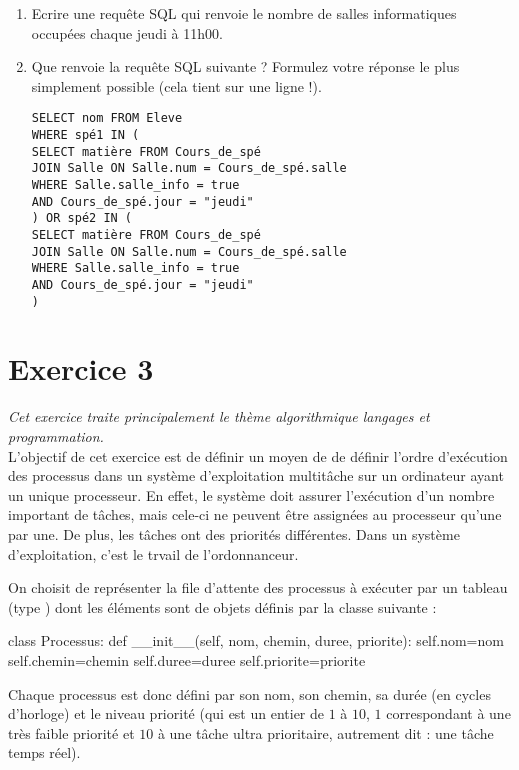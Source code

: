 \documentclass[11pt,a4paper,french,twoside]{PMCours}
\begin{document}
\begin{enumerate}
\item Ecrire une requête SQL qui renvoie le nombre de salles informatiques occupées chaque jeudi à 11h00.


\item Que renvoie la requête SQL suivante ? Formulez votre réponse le plus simplement possible (cela tient sur une ligne !).
\begin{verbatim}
SELECT nom FROM Eleve
WHERE spé1 IN (
SELECT matière FROM Cours_de_spé
JOIN Salle ON Salle.num = Cours_de_spé.salle
WHERE Salle.salle_info = true
AND Cours_de_spé.jour = "jeudi"
) OR spé2 IN (
SELECT matière FROM Cours_de_spé
JOIN Salle ON Salle.num = Cours_de_spé.salle
WHERE Salle.salle_info = true
AND Cours_de_spé.jour = "jeudi"
)
\end{verbatim}


\end{enumerate}

\newpage\noindent
\section*{Exercice 3}
\emph{Cet exercice traite principalement le thème \og{} algorithmique
langages et programmation\fg{}.} \medskip\\

L'objectif de cet exercice est de définir un moyen de de définir l'ordre 
d'exécution des processus dans un système d'exploitation multitâche sur un 
ordinateur ayant un unique processeur. En effet, le système doit assurer
l'exécution d'un nombre important de tâches, mais cele-ci ne peuvent être
assignées au processeur qu'une par une. De plus, les tâches ont des priorités
différentes. Dans un système d'exploitation, c'est le trvail de l'ordonnanceur.

\medskip
On choisit de représenter la file d'attente des processus à exécuter par 
un tableau (type ) dont les éléments sont de objets définis 
par la classe suivante :
\begin{Python}
class Processus:
    def __init__(self, nom, chemin, duree, priorite):
        self.nom=nom
        self.chemin=chemin
        self.duree=duree
        self.priorite=priorite
\end{Python}
Chaque processus est donc défini par son nom, son chemin, sa durée (en cycles 
d'horloge) et le niveau priorité (qui est un entier de $1$ à $10$, 
$1$ correspondant à une très faible priorité et $10$ à une tâche ultra prioritaire,
autrement dit : une tâche temps réel). 
\end{document}

